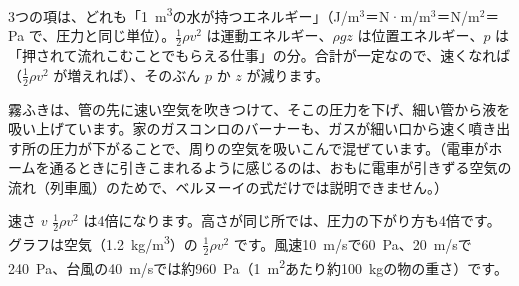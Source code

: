 \begin{phyomi}
3つの項は、どれも「\qty{1}{m^3}の水が持つエネルギー」（J/m$^3$＝N·m/m$^3$＝N/m$^2$＝Pa で、圧力と同じ単位）。$\tfrac{1}{2}\rho v^2$ は運動エネルギー、$\rho gz$ は位置エネルギー、$p$ は「押されて流れこむことでもらえる仕事」の分。合計が一定なので、速くなれば（$\tfrac{1}{2}\rho v^2$ が増えれば）、そのぶん $p$ か $z$ が減ります。
\end{phyomi}
\begin{phmijika}
霧ふきは、管の先に速い空気を吹きつけて、そこの圧力を下げ、細い管から液を吸い上げています。家のガスコンロのバーナーも、ガスが細い口から速く噴き出す所の圧力が下がることで、周りの空気を吸いこんで混ぜています。（電車がホームを通るときに引きこまれるように感じるのは、おもに電車が引きずる空気の流れ（列車風）のためで、ベルヌーイの式だけでは説明できません。）
\end{phmijika}
\begin{phbaisuru}{速さ $v$}
$\tfrac{1}{2}\rho v^2$ は4倍になります。高さが同じ所では、圧力の下がり方も4倍です。グラフは空気（\qty{1.2}{kg/m^3}）の $\tfrac{1}{2}\rho v^2$ です。風速\qty{10}{m/s}で\qty{60}{Pa}、\qty{20}{m/s}で\qty{240}{Pa}、台風の\qty{40}{m/s}では約\qty{960}{Pa}（\qty{1}{m^2}あたり約\qty{100}{kg}の物の重さ）です。
\par\vspace{2pt}\centering
{}
\end{phbaisuru}

